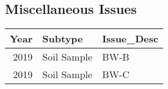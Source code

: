 \documentclass[
  landscape]{article}
\begin{document}
\hypertarget{miscellaneous-issues}{%
\subsection{Miscellaneous Issues}\label{miscellaneous-issues}}

\begin{longtable}[]{@{}rll@{}}
\toprule()
Year & Subtype & Issue\_Desc \\
\midrule()
\endhead
2019 & Soil Sample & BW-B \\
2019 & Soil Sample & BW-C \\
\bottomrule()
\end{longtable}
\end{document}
